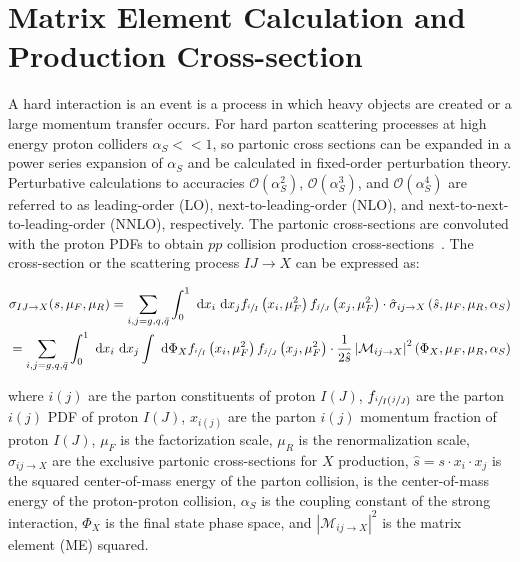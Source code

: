\section{Matrix Element Calculation and Production Cross-section}
\label{sec:Matrix_Element_Calculation_and_Production_Cross-section}
A hard interaction is an event is a process in which heavy objects are created or a large momentum transfer occurs.
For hard parton scattering processes at high energy proton colliders $\alpha_S << 1$, so partonic cross sections can be expanded in a power series expansion of $\alpha_S$ and be calculated in fixed-order perturbation theory. 
Perturbative calculations to accuracies $\mathcal{O}(\alpha^2_S)$, $\mathcal{O}(\alpha^3_S)$, and $\mathcal{O}(\alpha^4_S)$ are referred to as leading-order (LO), next-to-leading-order (NLO), and next-to-next-to-leading-order (NNLO), respectively.
The partonic cross-sections are convoluted with the proton PDFs to obtain $pp$ collision production cross-sections~\cite{BUCKLEY2011145}.
The cross-section or the scattering process $IJ \rightarrow X$ can be expressed as:
\begin{linenomath*}
\begin{align}
\sigma_{IJ \rightarrow X}(s, \mu_F, \mu_R) = \sum_{i, j = g, q, \bar{q}}^{} \int_{0}^{1} \mathrm{~d} x_i \mathrm{~d} x_j f_{\sfrac{i}{I}}\left(x_i, \mu_F^2\right) f_{\sfrac{j}{J}}\left(x_j, \mu_F^2\right) \cdot \hat{\sigma}_{i j \rightarrow X}\left(\hat{s}, \mu_F, \mu_R, \alpha_S\right) \\
=\sum_{i, j=g, q, \bar{q}} \int_{0}^{1} \mathrm{~d} x_i \mathrm{~d} x_j \int \mathrm{~d} \Phi_X f_{\sfrac{i}{I}}\left(x_i, \mu_F^2\right) f_{\sfrac{j}{J}}\left(x_j, \mu_F^2\right) \cdot \frac{1}{2 \hat{s}}\left\vert \mathcal{M}_{i j \rightarrow X}\right\vert^2\left(\Phi_X, \mu_F, \mu_R, \alpha_S\right)
\label{ttbar_crosssection}
\end{align}
\end{linenomath*}
where $i(j)$ are the parton constituents of proton $I(J)$, $f_{{\sfrac{i}{I}}({\sfrac{j}{J}})}$ are the parton $i(j)$ PDF of proton $I(J)$, $x_{i(j)}$ are the parton $i(j)$ momentum fraction of proton $I(J)$, $\mu_F$ is the factorization scale, $\mu_R$ is the renormalization scale, $\sigma_{i j \rightarrow X}$ are the exclusive partonic cross-sections for $X$ production, $\hat{s} = s \cdot x_i \cdot x_j$ is the squared center-of-mass energy of the parton collision, \beamenergy is the center-of-mass energy of the proton-proton collision, $\alpha_S$ is the coupling constant of the strong interaction, $\Phi_X$ is the final state phase space, and $\left\vert \mathcal{M}_{i j \rightarrow X}\right\vert^2$ is the matrix element (ME) squared.
